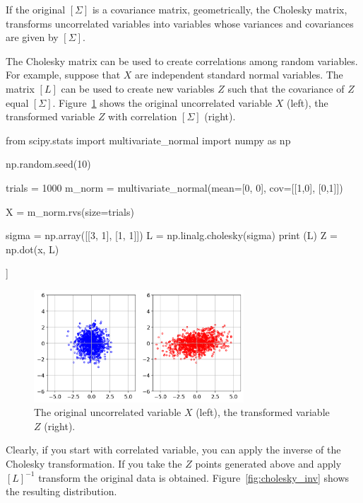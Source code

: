 If the original $[\Sigma]$ is a covariance matrix, geometrically, the Cholesky matrix, transforms uncorrelated variables into variables whose variances and covariances are given by $[\Sigma]$. 

The Cholesky matrix can be used to create correlations among random variables. For example, suppose that $X$  are independent standard normal variables. The matrix $[L]$ can be used to create new variables $Z$ such that the covariance of $Z$ equal $[\Sigma]$.
Figure~\ref{fig:cholesky_norm} shows the original uncorrelated variable $X$ (left), the transformed variable $Z$ with correlation $[\Sigma]$ (right).

\begin{ipython}
from scipy.stats import multivariate_normal
import numpy as np

np.random.seed(10)

trials = 1000
m_norm = multivariate_normal(mean=[0, 0], cov=[[1,0],
                                               [0,1]])

X = m_norm.rvs(size=trials)

sigma = np.array([[3, 1], [1, 1]])
L = np.linalg.cholesky(sigma)
print (L)
Z = np.dot(x, L)
\end{ipython}
\begin{ioutput}
[[1.73205081 0.        ]
 [0.57735027 0.81649658]]
\end{ioutput}

\begin{figure}[htbp]
  \centering
  \includegraphics[width=0.7\textwidth]{figures/cholesky_norm}
  \caption{The original uncorrelated variable $X$ (left), the transformed variable $Z$ (right).}
  \label{fig:cholesky_norm}
\end{figure}

Clearly, if you start with correlated variable, you can apply the inverse of the Cholesky transformation.
If you take the $Z$ points generated above and apply $[L]^{-1}$ transform the original data is obtained. Figure~\ref{fig:cholesky_inv} shows the resulting distribution.

